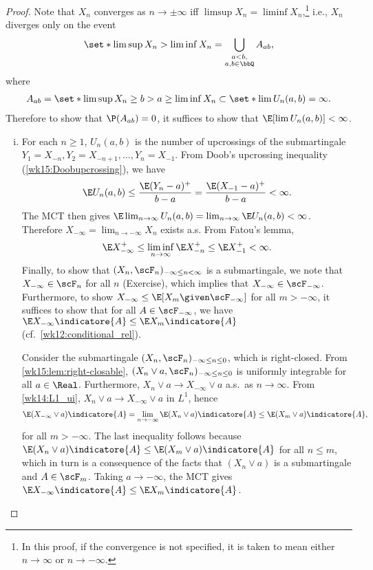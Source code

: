 \documentclass[../aipt.tex]{subfiles}
\begin{document}
\begin{proof}
Note that $X_n$ converges as $n\to\pm\infty$ iff $\limsup X_n = \liminf X_n$,\footnote{In this proof, if the convergence is not specified, it is taken to mean either $n\to\infty$ or $n\to-\infty$.} i.e., $X_n$ diverges only on the event
\begin{align*}
\set*{\limsup X_n > \liminf X_n} = \bigcup_{\substack{a < b,\\ a,b\in\bbQ}} A_{ab},
\end{align*}
where
\begin{align*}
A_{ab} = \set*{\limsup X_n \geq b > a \geq \liminf X_n} \subset \set*{\lim U_n(a,b) = \infty}.
\end{align*}
Therefore to show that $\P(A_{ab})=0$, it suffices to show that $\E[\lim U_n(a,b)] < \infty$.

\begin{enumerate}[(i)]
	\item For each $n\geq1$, $U_n(a,b)$ is the number of upcrossings of the submartingale $Y_1=X_{-n}, Y_2=X_{-n+1}, \ldots, Y_n=X_{-1}$. From Doob's upcrossing inequality (\cref{wk15:Doobupcrossing}), we have
	\begin{align*}
	\E U_n(a,b) \leq \frac{\E(Y_n-a)^+}{b-a} = \frac{\E(X_{-1}-a)^+}{b-a} < \infty.
	\end{align*}
	The MCT then gives $\E\lim_{n\to\infty} U_n(a,b) = \lim_{n\to\infty} \E U_n(a,b) < \infty$. Therefore $X_{-\infty}=\lim_{n\to-\infty} X_n$ exists a.s. From Fatou's lemma, 
	\begin{align*}
	\E X_{-\infty}^+ \leq \liminf_{n\to\infty} \E X_{-n}^+ \leq \E X_{-1}^+ <\infty.
	\end{align*}
	Finally, to show that $(X_n,\scF_n)_{-\infty\leq n<\infty}$ is a submartingale, we note that $X_{-\infty}\in\scF_n$ for all $n$ (Exercise), which implies that $X_{-\infty}\in\scF_{-\infty}$. Furthermore, to show $X_{-\infty} \leq \E[ X_m \given \scF_{-\infty}]$ for all $m>-\infty$, it suffices to show that for all $A\in\scF_{-\infty}$, we have $\E X_{-\infty}\indicatore{A} \leq \E X_m\indicatore{A}$ (cf.\ \cref{wk12:conditional_rel}).
	
	Consider the submartingale $(X_n,\scF_n)_{-\infty\leq n\leq 0}$, which is right-closed. From \cref{wk15:lem:right-closable}, $(X_n\vee a,\scF_n)_{-\infty\leq n\leq 0}$ is uniformly integrable for all $a\in\Real$. Furthermore, $X_n\vee a \to X_{-\infty}\vee a$ a.s.\ as $n\to\infty$. From \cref{wk14:L1_ui}, $X_n\vee a \to X_{-\infty}\vee a$ in $L^1$, hence
	\begin{align*}
	\E (X_{-\infty}\vee a)\indicatore{A} = \lim_{n\to-\infty} \E (X_n\vee a)\indicatore{A} \leq \E(X_m\vee a)\indicatore{A},
	\end{align*}
	for all $m>-\infty$. The last inequality follows because $\E (X_n\vee a)\indicatore{A} \leq \E(X_m\vee a)\indicatore{A}$ for all $n\leq m$, which in turn is a consequence of the facts that $(X_n\vee a)$ is a submartingale and $A\in\scF_m$. Taking $a\to-\infty$, the MCT gives $\E X_{-\infty}\indicatore{A} \leq \E X_m\indicatore{A}$.
	

\end{enumerate}
\end{proof}
\end{document}
